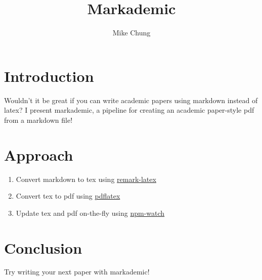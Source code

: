 \documentclass{article}
\title{Markademic}
\author{Mike Chung}
\begin{document}
\maketitle

\section{Introduction}


Wouldn't it be great if you can write academic papers using markdown instead of latex?
I present markademic, a pipeline for creating an academic paper-style pdf from a markdown file!


\section{Approach}

\begin{enumerate}
[start=1]
\item 
Convert markdown to tex using \href{https://github.com/Paperist/remark-latex}{remark-latex}

\item 
Convert tex to pdf using \href{https://www.tug.org/applications/pdftex/}{pdflatex}

\item 
Update tex and pdf on-the-fly using \href{https://www.npmjs.com/package/npm-watch}{npm-watch}

\end{enumerate}

\section{Conclusion}


Try writing your next paper with markademic!
\end{document}
